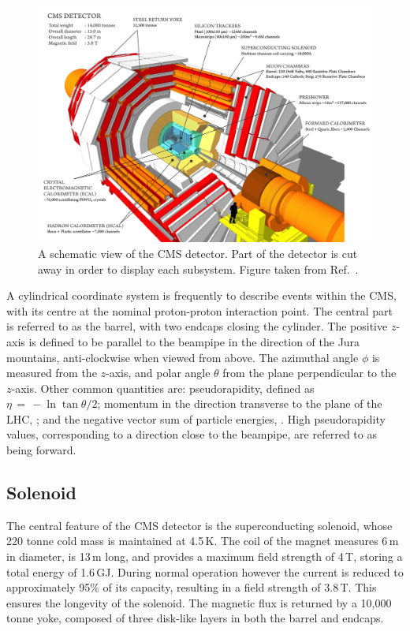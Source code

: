 \begin{figure}[h!]
  \centering
  \includegraphics[width=\textwidth]{Figures/Detector/CMSschematic.png}
  \caption[A schematic view of the CMS detector.]
  {A schematic view of the CMS detector.
  Part of the detector is cut away in order to display each subsystem.
  Figure taken from Ref.~\cite{SketchUp}.}
  \label{fig:detector_CMSschematic}
\end{figure}

A cylindrical coordinate system is frequently to describe events within the CMS, with its centre at the nominal proton-proton interaction point.
The central part is referred to as the barrel, with two endcaps closing the cylinder.
The positive $z$-axis is defined to be parallel to the beampipe in the direction of the Jura mountains, anti-clockwise when viewed from above.
The azimuthal angle $\phi$ is measured from the $z$-axis, and polar angle $\theta$ from the plane perpendicular to the $z$-axis.
Other common quantities are: pseudorapidity, defined as $\eta \, = \, -\ln{\tan{\theta/2}}$; 
momentum in the direction transverse to the plane of the LHC, \pt; 
and the negative vector sum of particle energies, \met.
High pseudorapidity values, corresponding to a direction close to the beampipe, are referred to as being forward.

\subsection{Solenoid}

The central feature of the CMS detector is the superconducting solenoid, whose 220 tonne cold mass is maintained at 4.5\,K.%
The coil of the magnet measures 6\,m in diameter, is 13\,m long, and provides a maximum field strength of 4\,T, storing a total energy of 1.6\,GJ.
During normal operation however the current is reduced to approximately 95\% of its capacity, resulting in a field strength of 3.8\,T.
This ensures the longevity of the solenoid.
The magnetic flux is returned by a 10,000 tonne yoke, composed of three disk-like layers in both the barrel and endcaps.

